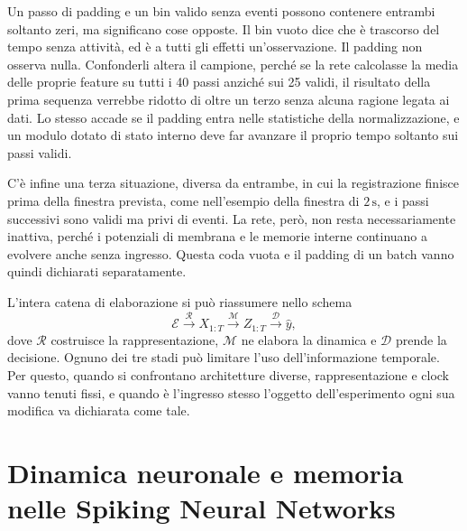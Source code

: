 Un passo di padding e un bin valido senza eventi possono contenere entrambi soltanto zeri, ma significano cose opposte. Il bin vuoto dice che è trascorso del tempo senza attività, ed è a tutti gli effetti un'osservazione. Il padding non osserva nulla. Confonderli altera il campione, perché se la rete calcolasse la media delle proprie feature su tutti i 40 passi anziché sui 25 validi, il risultato della prima sequenza verrebbe ridotto di oltre un terzo senza alcuna ragione legata ai dati. Lo stesso accade se il padding entra nelle statistiche della normalizzazione, e un modulo dotato di stato interno deve far avanzare il proprio tempo soltanto sui passi validi.

C'è infine una terza situazione, diversa da entrambe, in cui la registrazione finisce prima della finestra prevista, come nell'esempio della finestra di $2\,\mathrm{s}$, e i passi successivi sono validi ma privi di eventi. La rete, però, non resta necessariamente inattiva, perché i potenziali di membrana e le memorie interne continuano a evolvere anche senza ingresso. Questa coda vuota e il padding di un batch vanno quindi dichiarati separatamente.

L'intera catena di elaborazione si può riassumere nello schema
\begin{equation}
\label{eq:decomposizione_flusso}
\mathcal E
\overset{\mathcal R}{\longrightarrow}X_{1:T}
\overset{\mathcal M}{\longrightarrow}Z_{1:T}
\overset{\mathcal D}{\longrightarrow}\hat y,
\end{equation}
dove $\mathcal R$ costruisce la rappresentazione, $\mathcal M$ ne elabora la dinamica e $\mathcal D$ prende la decisione. Ognuno dei tre stadi può limitare l'uso dell'informazione temporale. Per questo, quando si confrontano architetture diverse, rappresentazione e clock vanno tenuti fissi, e quando è l'ingresso stesso l'oggetto dell'esperimento ogni sua modifica va dichiarata come tale.



\section{Dinamica neuronale e memoria nelle Spiking Neural Networks}
\label{sec:dinamica_neuronale_memoria}

